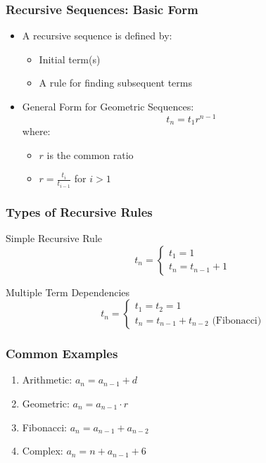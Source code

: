 \documentclass{beamer}
\begin{document}
\begin{frame}
\frametitle{Recursive Sequences: Basic Form}
\begin{itemize}
    \item A recursive sequence is defined by:
    \begin{itemize}
        \item Initial term(s)
        \item A rule for finding subsequent terms
    \end{itemize}
    \item General Form for Geometric Sequences:
    \[ t_n = t_1r^{n-1} \]
    where:
    \begin{itemize}
        \item $r$ is the common ratio
        \item $r = \frac{t_i}{t_{i-1}}$ for $i > 1$
    \end{itemize}
\end{itemize}
\end{frame}

\begin{frame}
\frametitle{Types of Recursive Rules}
\begin{block}{Simple Recursive Rule}
\[ t_n = \begin{cases} 
t_1 = 1 \\
t_n = t_{n-1} + 1
\end{cases} \]
\end{block}

\begin{block}{Multiple Term Dependencies}
\[ t_n = \begin{cases}
t_1 = t_2 = 1 \\
t_n = t_{n-1} + t_{n-2} \text{ (Fibonacci)}
\end{cases} \]
\end{block}
\end{frame}

\begin{frame}
\frametitle{Common Examples}
\begin{enumerate}
    \item Arithmetic: $a_n = a_{n-1} + d$
    \item Geometric: $a_n = a_{n-1} \cdot r$
    \item Fibonacci: $a_n = a_{n-1} + a_{n-2}$
    \item Complex: $a_n = n + a_{n-1} + 6$
\end{enumerate}
\end{frame}
\end{document}
